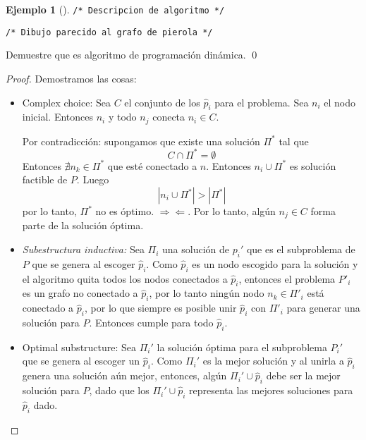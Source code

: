 \documentclass[english, spanish, fleqn, 10pt]{article}
\newcommand{\comentarioc}[1]{\texttt{\textcolor{webred}{/* #1 */}}}
\numberwithin{equation}{section}
\newcommand{\nabsoluto}[1]{\left| #1 \right|}
\theoremstyle{definition}
\newtheorem{beforeExample}{Ejemplo}[section]
\newenvironment{ejemplo}[1][]{\begin{beforeExample}[#1]\renewcommand{\qedsymbol}{$\blacksquare$}}{\qed\end{beforeExample}}
\begin{document}
\begin{ejemplo}
	\comentarioc{Descripcion de algoritmo}
	\begin{center}
		\comentarioc{Dibujo parecido al grafo de pierola}
	\end{center}
	Demuestre que es algoritmo de programación dinámica.
\end{ejemplo}
\begin{proof}
	Demostramos las cosas:
	\begin{itemize}
		\item Complex choice: Sea $C$ el conjunto de los $\hat p _i$ para el problema. Sea $n_i$ el nodo inicial. Entonces $n_i$ y todo $n_j$  conecta $n_i\in C$.
		
		Por contradicción: supongamos que existe una solución $\Pi^*$ tal que
		\begin{equation*}
		C\cap \Pi^* = \emptyset
		\end{equation*} 
		Entonces $\nexists n_k \in \Pi ^* $ que esté conectado a $n$. Entonces $n_i\cup \Pi ^*$ es solución factible de $P$. Luego
		\begin{equation*}
		\nabsoluto{n_i\cup \Pi^*} > \nabsoluto{\Pi ^*}
		\end{equation*}
		por lo tanto, $\Pi ^*$ no es óptimo. $\Rightarrow\Leftarrow$. Por lo tanto, algún $n_j\in C$ forma parte de la solución óptima.
		
		\item \emph{Subestructura inductiva:} Sea $\Pi_i$ una solución de $p_i'$ que es el subproblema de $P$ que se genera al escoger $\hat p_i$. Como $\hat p_i$ es un nodo escogido para la solución y el algoritmo quita todos los nodos conectados a $\hat p_i$, entonces el problema $P'_i$  es un grafo no conectado a $\hat p_i$, por lo tanto ningún nodo $n_k\in \Pi'_i$ está conectado a $\hat p_i$, por lo que siempre es posible unir $\hat p_i$ con $\Pi'_i$ para generar una solución para $P$. Entonces cumple para todo $\hat p_i$.
		
		\item Optimal substructure: Sea $\Pi_i'$ la solución óptima para el subproblema $P_i'$ que se genera al escoger un $\hat p_i$. Como $\Pi_i'$ es la mejor solución y al unirla a $\hat p_i$ genera una solución aún mejor, entonces, algún $\Pi_i'\cup \hat p_i$ debe ser la mejor solución para $P$, dado que los $\Pi_i'\cup \hat p_i$ representa las mejores soluciones para $\hat p_i$ dado.
	\end{itemize}
\end{proof}
\end{document}
